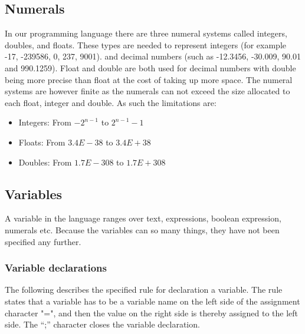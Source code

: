 \subsection{Numerals}
In our programming language there are three numeral systems called integers, doubles, and floats. These types are needed to represent integers (for example -17, -239586, 0, 237, 9001). and decimal numbers (such as -12.3456, -30.009, 90.01 and 990.1259). Float and double are both used for decimal numbers with double being more precise than float at the cost of taking up more space. The numeral systems are however finite as the numerals can not exceed the size allocated to each float, integer and double. As such the limitations are:
\begin{itemize}
\item Integers: From $-2^{n-1}$ to $2^{n-1}-1$
\item Floats: From $3.4E-38$ to $3.4E+38$
\item Doubles: From $1.7E-308$ to $1.7E+308$
\end{itemize}

\subsection{Variables}
A variable in the language ranges over text, expressions, boolean expression, numerals etc. Because the variables can so many things, they have not been specified any further. 


\subsubsection{Variable declarations}\label{sec:analysis:syntax-definition:variable-declaration}
The following describes the specified rule for declaration a variable. The rule states that a variable has to be a variable name on the left side of the assignment character "=", and then the value on the right side is thereby assigned to the left side. The ``;'' character closes the variable declaration.

